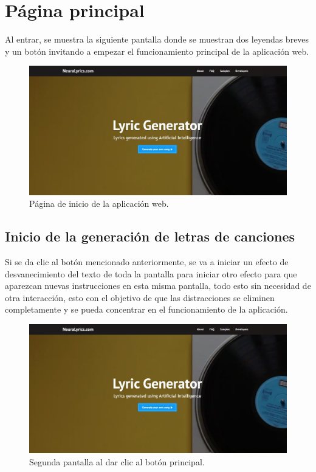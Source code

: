 \documentclass[12pt, a4paper, titlepage]{article}
\begin{document}
	\section{Página principal}
	Al entrar, se muestra la siguiente pantalla donde se muestran dos leyendas breves y un botón invitando a empezar el funcionamiento principal de la aplicación web.
	\begin{figure}[H] 
		\includegraphics[width=13.5cm]{./Imagenes/Capturas/pprincipal.jpg}
		\centering \caption{Página de inicio de la aplicación web.}
	\end{figure}
	\subsection{Inicio de la generación de letras de canciones}
		Si se da clic al botón mencionado anteriormente, se va a iniciar un efecto de desvanecimiento del texto de toda la pantalla para iniciar otro efecto para que aparezcan nuevas instrucciones en esta misma pantalla, todo esto sin necesidad de otra interacción, esto con el objetivo de que las distracciones se eliminen completamente y se pueda concentrar en el funcionamiento de la aplicación.
		\begin{figure}[H] 
			\includegraphics[width=13.5cm]{./Imagenes/Capturas/pprincipal.jpg}
			\centering \caption{Segunda pantalla al dar clic al botón principal.}
		\end{figure}
\end{document}

